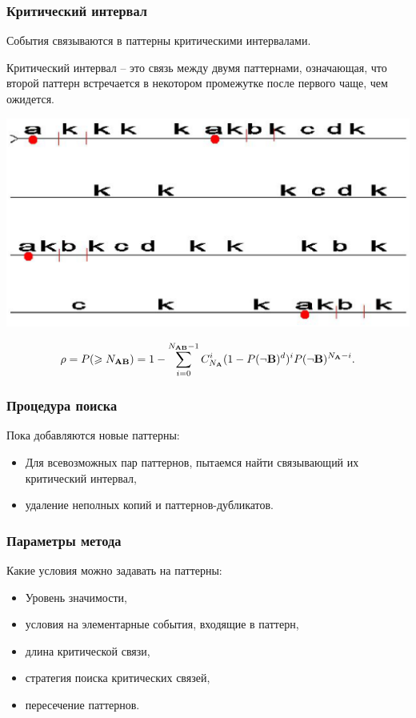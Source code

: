 \documentclass[smaller]{beamer}
\newcommand{\eA}{ {\bf A} }
\newcommand{\eB}{ {\bf B} }
\begin{document}
\begin{frame}
  \frametitle{Критический интервал}
 
      События связываются в паттерны критическими интервалами.

      Критический интервал -- это связь между двумя паттернами, означающая, что второй паттерн встречается в некотором промежутке после первого чаще, чем ожидется.
	
  \begin{center}
      \includegraphics[scale=0.22]{TSCI.eps}
    \end{center}
$$\rho = P(\geqslant N_{\eA\eB}) = 1 - \sum_{i=0}^{N_{\eA\eB}-1}C_{N_{\eA}}^i( 1-P(\neg\eB)^d )^iP(\neg\eB)^{N_{\eA}-i}.$$
\end{frame}

\begin{frame}
  \frametitle{Процедура поиска}
  Пока добавляются новые паттерны:
  \begin{itemize}
  \item Для всевозможных пар паттернов, пытаемся найти связывающий их критический интервал,
  \item удаление неполных копий и паттернов-дубликатов.
   \end{itemize}

\end{frame}

\begin{frame}
  \frametitle{Параметры метода}
  Какие условия можно задавать на паттерны:
  \begin{itemize}
  \item Уровень значимости,
  \item условия на элементарные события, входящие в паттерн,
  \item длина критической связи,
  \item стратегия поиска критических связей,
  \item пересечение паттернов.
   \end{itemize}
\end{frame}
\end{document}
